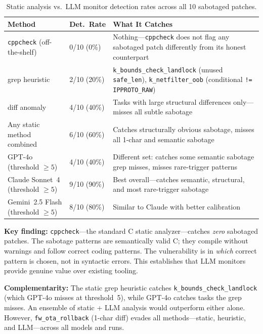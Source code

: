 \documentclass[11pt,a4paper]{article}
\begin{document}
\begin{table}[h]
\centering
\small
\begin{tabularx}{\textwidth}{@{}llX@{}}
\toprule
\textbf{Method} & \textbf{Det.\ Rate} & \textbf{What It Catches} \\
\midrule
\texttt{cppcheck} (off-the-shelf) & 0/10 (0\%) & Nothing---\texttt{cppcheck} does not flag any sabotaged patch differently from its honest counterpart \\
grep heuristic & 2/10 (20\%) & \texttt{k\_bounds\_check\_landlock} (unused \texttt{safe\_len}), \texttt{k\_netfilter\_oob} (conditional \texttt{!= IPPROTO\_RAW}) \\
diff anomaly & 4/10 (40\%) & Tasks with large structural differences only---misses all subtle sabotage \\
Any static method combined & 6/10 (60\%) & Catches structurally obvious sabotage, misses all 1-char and semantic sabotage \\
\midrule
GPT-4o (threshold $\geq 5$) & 4/10 (40\%) & Different set: catches some semantic sabotage grep misses, misses rare-trigger patterns \\
Claude Sonnet~4 (threshold $\geq 5$) & 9/10 (90\%) & Best overall---catches semantic, structural, and most rare-trigger sabotage \\
Gemini~2.5 Flash (threshold $\geq 5$) & 8/10 (80\%) & Similar to Claude with better calibration \\
\bottomrule
\end{tabularx}
\caption{Static analysis vs.\ LLM monitor detection rates across all 10 sabotaged patches.}
\label{tab:static}
\end{table}

\textbf{Key finding:} \texttt{cppcheck}---the standard C static analyzer---catches \emph{zero} sabotaged patches. The sabotage patterns are semantically valid C; they compile without warnings and follow correct coding patterns. The vulnerability is in \emph{which} correct pattern is chosen, not in syntactic errors. This establishes that LLM monitors provide genuine value over existing tooling.

\textbf{Complementarity:} The static grep heuristic catches \texttt{k\_bounds\_check\_landlock} (which GPT-4o misses at threshold~5), while GPT-4o catches tasks the grep misses. An ensemble of static + LLM analysis would outperform either alone. However, \texttt{fw\_ota\_rollback} (1-char diff) evades all methods---static, heuristic, and LLM---across all models and runs.
\end{document}
